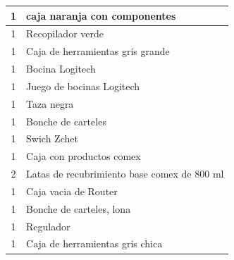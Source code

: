 \documentclass[a4paper,11pt]{article}                 %
\begin{document}
\begin{table}[H]
\begin{tabular}{|c|l|}
    1        & caja naranja con componentes                       \\ \hline
    1        & Recopilador verde                                  \\ \hline
    1        & Caja de herramientas gris grande                   \\ \hline
    1        & Bocina Logitech                                    \\ \hline
    1        & Juego de bocinas Logitech                          \\ \hline
    1        & Taza negra                                         \\ \hline
    1        & Bonche de carteles                                 \\ \hline
    1        & Swich Zchet                                        \\ \hline
    1        & Caja con productos comex                           \\ \hline
    2        & Latas de recubrimiento base comex de 800 ml        \\ \hline
    1        & Caja vacia de Router                               \\ \hline
    1        & Bonche de carteles, lona                           \\ \hline
    1        & Regulador                                          \\ \hline
    1        & Caja de herramientas gris chica                    \\ \hline
    \end{tabular}
    \end{table}
\end{document}
